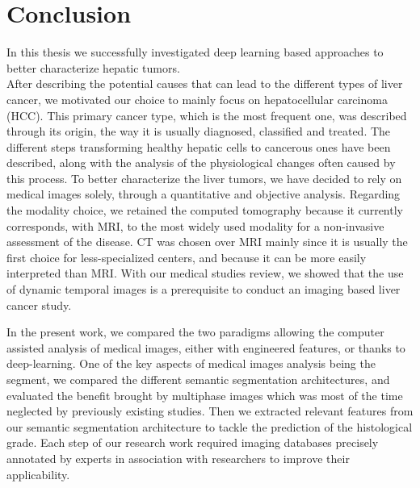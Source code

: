 \chapter{Conclusion}\label{conclusion}

In this thesis we successfully investigated deep learning based
approaches to better characterize hepatic tumors.\\
After describing the potential causes that can lead to the different
types of liver cancer, we motivated our choice to mainly focus on
hepatocellular carcinoma (HCC).
This primary cancer type, which is the most frequent one, was described
through its origin, the way it is usually diagnosed, classified and
treated.
The different steps transforming healthy hepatic cells to cancerous ones
have been described, along with the analysis of the physiological
changes often caused by this process.
To better characterize the liver tumors, we have decided to rely on
medical images solely, through a quantitative and objective analysis.
Regarding the modality choice, we retained the computed tomography
because it currently corresponds, with MRI, to the most widely used modality 
for a non-invasive assessment of the disease.
CT was chosen over MRI mainly since it is usually the first choice for
less-specialized centers, and because it can be more easily interpreted
than MRI. With our medical studies review, we showed that the use of
dynamic temporal images is a prerequisite to conduct an imaging based liver cancer
study.

In the present work, we compared the two paradigms allowing the computer
assisted analysis of medical images, either with engineered features, or
thanks to deep-learning. One of the key aspects of medical images
analysis being the segment, we compared the different semantic
segmentation architectures, and evaluated the benefit brought by
multiphase images which was most of the time neglected by previously
existing studies. Then we extracted relevant features from our semantic
segmentation architecture to tackle the prediction of the histological
grade. Each step of our research work required imaging databases
precisely annotated by experts in association with researchers to
improve their applicability.

